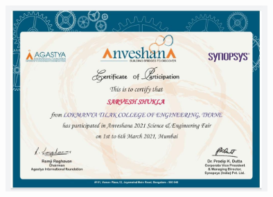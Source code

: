 \vspace{1cm}

\begin{figure}[h]
    \centering
    \includegraphics[width=100mm,scale=1]{sarvesh2}
\end{figure}

 